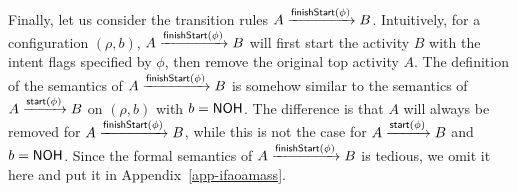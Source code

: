 {%

Finally, let us consider the transition rules $A \xrightarrow{{\mathsf{finishStart} }(\phi)} B$. 
Intuitively, for a configuration $(\rho, b)$, $A \xrightarrow{{\mathsf{finishStart} }(\phi)} B$ will first start the activity $B$ with the intent flags specified by $\phi$,  then remove the original top activity $A$.
The definition of the semantics of $A \xrightarrow{{\mathsf{finishStart} }(\phi)} B$ is somehow similar to the semantics of $A \xrightarrow{{\mathsf{start} }(\phi)} B$ on $(\rho, b)$ with $b = {\sf NOH}$. The difference is that $A$ will always be removed for $A \xrightarrow{{\mathsf{finishStart} }(\phi)} B$, while this is not the case for $A \xrightarrow{{\mathsf{start} }(\phi)} B$ and $b = {\sf NOH}$. 
Since the formal semantics of $A \xrightarrow{{\mathsf{finishStart} }(\phi)} B$ is tedious, we omit it here and put it in Appendix~\ref{app-ifaoamass}. 
}






